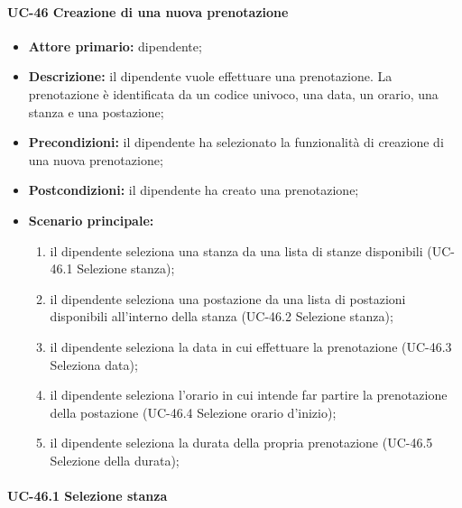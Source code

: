 
\paragraph{UC-46 Creazione di una nuova prenotazione}
    \begin{itemize}
	    \item \textbf{Attore primario:} dipendente;

	    \item \textbf{Descrizione:} il dipendente vuole effettuare una prenotazione. La prenotazione è identificata da un codice univoco, una data, un orario, una stanza e una postazione;

	    \item \textbf{Precondizioni:} il dipendente ha selezionato la funzionalità di creazione di una nuova prenotazione;

	    \item \textbf{Postcondizioni:} il dipendente ha creato una prenotazione;

	    \item \textbf{Scenario principale:}
	        \begin{enumerate}
		        \item il dipendente seleziona una stanza da una lista di stanze disponibili (UC-46.1 Selezione stanza);
		        \item il dipendente seleziona una postazione da una lista di postazioni disponibili all'interno della stanza (UC-46.2 Selezione stanza); 
		        \item il dipendente seleziona la data in cui effettuare la prenotazione (UC-46.3 Seleziona data);
		        \item il dipendente seleziona l'orario in cui intende far partire la prenotazione della postazione (UC-46.4 Selezione orario d'inizio);
		        \item il dipendente seleziona la durata della propria prenotazione (UC-46.5 Selezione della durata);
	        \end{enumerate}
    \end{itemize}

\paragraph{UC-46.1 Selezione stanza}

